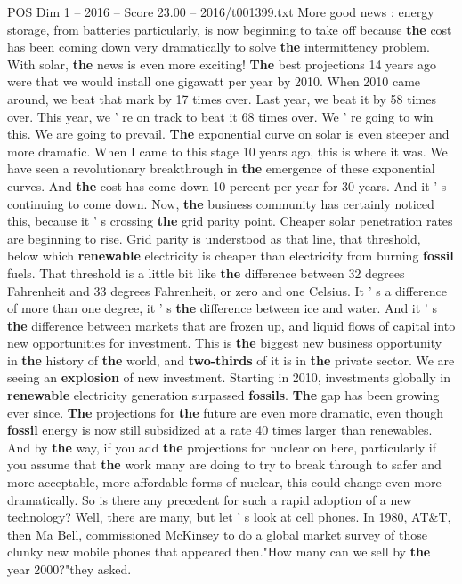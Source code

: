 \begin{textsample}{POS Dim 1 – 2016 – Score 23.00 – 2016/t001399.txt}
More good news : energy storage, from batteries particularly, is now beginning to take off because \textbf{the} cost has been coming down very dramatically to solve \textbf{the} intermittency problem.
With solar, \textbf{the} news is even more exciting! \textbf{The} best projections 14 years ago were that we would install one gigawatt per year by 2010.
When 2010 came around, we beat that mark by 17 times over.
Last year, we beat it by 58 times over.
This year, we ' re on track to beat it 68 times over.
We ' re going to win this.
We are going to prevail. \textbf{The} exponential curve on solar is even steeper and more dramatic.
When I came to this stage 10 years ago, this is where it was.
We have seen a revolutionary breakthrough in \textbf{the} emergence of these exponential curves.
And \textbf{the} cost has come down 10 percent per year for 30 years.
And it ' s continuing to come down.
Now, \textbf{the} business community has certainly noticed this, because it ' s crossing \textbf{the} grid parity point.
Cheaper solar penetration rates are beginning to rise.
Grid parity is understood as that line, that threshold, below which \textbf{renewable} electricity is cheaper than electricity from burning \textbf{fossil} fuels.
That threshold is a little bit like \textbf{the} difference between 32 degrees Fahrenheit and 33 degrees Fahrenheit, or zero and one Celsius.
It ' s a difference of more than one degree, it ' s \textbf{the} difference between ice and water.
And it ' s \textbf{the} difference between markets that are frozen up, and liquid flows of capital into new opportunities for investment.
This is \textbf{the} biggest new business opportunity in \textbf{the} history of \textbf{the} world, and \textbf{two-thirds} of it is in \textbf{the} private sector.
We are seeing an \textbf{explosion} of new investment.
Starting in 2010, investments globally in \textbf{renewable} electricity generation surpassed \textbf{fossils}. \textbf{The} gap has been growing ever since. \textbf{The} projections for \textbf{the} future are even more dramatic, even though \textbf{fossil} energy is now still subsidized at a rate 40 times larger than renewables.
And by \textbf{the} way, if you add \textbf{the} projections for nuclear on here, particularly if you assume that \textbf{the} work many are doing to try to break through to safer and more acceptable, more affordable forms of nuclear, this could change even more dramatically.
So is there any precedent for such a rapid adoption of a new technology?
Well, there are many, but let ' s look at cell phones.
In 1980, AT\&T, then Ma Bell, commissioned McKinsey to do a global market survey of those clunky new mobile phones that appeared then."How many can we sell by \textbf{the} year 2000?"they asked.

\end{textsample}
